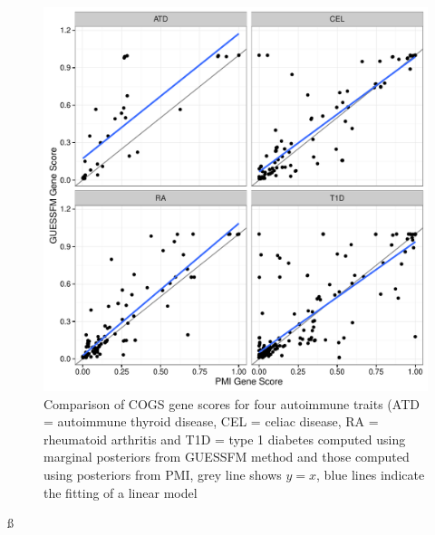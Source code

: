 \documentclass[a4paper,11pt]{report}
\begin{document}

\begin{figure}[h]
\includegraphics[width=\textwidth]{gfm_vs_pmi_gs.pdf}
\caption{Comparison of COGS gene scores for four autoimmune traits (ATD = autoimmune thyroid disease, CEL = celiac disease, RA = rheumatoid arthritis and T1D = type 1 diabetes computed using marginal posteriors from GUESSFM method and those computed using posteriors from PMI, grey line shows $y=x$, blue lines indicate the fitting of a linear model}
\label{fig:gfm_vs_pmi_gs}
\end{figure}ß
\end{document}
